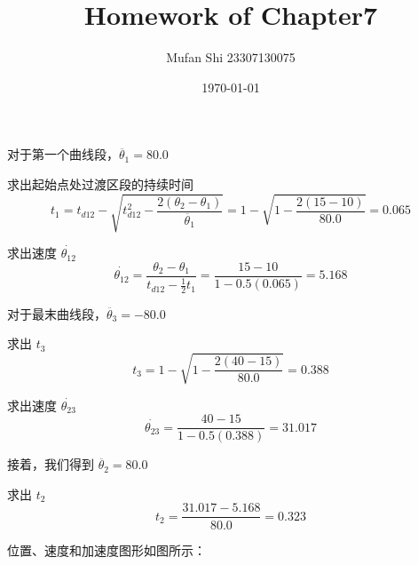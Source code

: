 \documentclass{homework}
\author{Mufan Shi 23307130075}
\date{\today}
\title{Homework of Chapter7}
\begin{document}
 \maketitle

\question

\begin{sol}

对于第一个曲线段，$ \ddot{\theta_1} = 80.0 $

求出起始点处过渡区段的持续时间
\[
  t_1 = t_{d12} - \sqrt{t_{d12}^2 - \frac{2(\theta_2 - \theta_1)}{\ddot{\theta_1}}} = 1 - \sqrt{1 - \frac{2(15 - 10)}{80.0}} = 0.065
\]

求出速度 $ \dot{\theta_{12}} $
\[
  \dot{\theta_{12}} = \frac{\theta_2 - \theta_1}{t_{d12} - \frac{1}{2} t_1} = \frac{15 - 10}{1 - 0.5(0.065)} = 5.168
\]  

对于最末曲线段，$ \ddot{\theta_3} = -80.0 $

求出 $ t_3 $
\[
  t_3 = 1 - \sqrt{1 - \frac{2(40 - 15)}{80.0}} = 0.388
\]

求出速度 $ \dot{\theta_{23}} $
\[
  \dot{\theta_{23}} = \frac{40 - 15}{1 - 0.5(0.388)} = 31.017
\]

接着，我们得到 $ \ddot{\theta_2} = 80.0 $

求出 $ t_2 $
\[
  t_2 = \frac{31.017 - 5.168}{80.0} = 0.323
\]

位置、速度和加速度图形如图所示：

\end{sol}

\question
\end{document}
